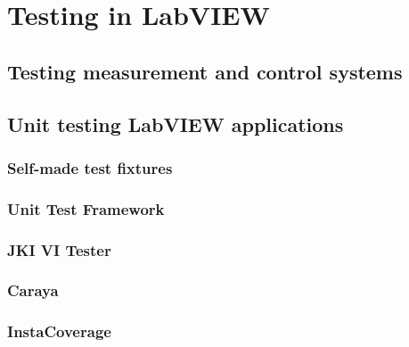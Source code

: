 \chapter{Testing in LabVIEW}

\section{Testing measurement and control systems}
\section{Unit testing LabVIEW applications}
\subsection{Self-made test fixtures}
\subsection{Unit Test Framework}
\subsection{JKI VI Tester}
\subsection{Caraya}
\subsection{InstaCoverage}